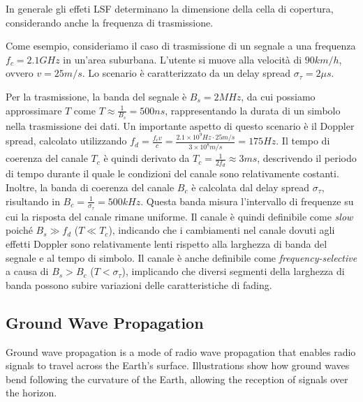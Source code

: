 In generale gli effeti LSF determinano la dimensione della cella di copertura, considerando anche la frequenza di trasmissione.


Come esempio, consideriamo il caso di trasmissione di un segnale a una frequenza \( f_c = 2.1 \si{GHz} \) in un'area suburbana. L'utente si muove alla velocità di $90 \si{km/h}$, ovvero \( v = 25 \si{m/s} \). Lo scenario è caratterizzato da un delay spread \( \sigma_\tau = 2 \si{\mu s} \).

Per la trasmissione, la banda del segnale è \( B_s = 2 \si{MHz} \), da cui possiamo approssimare \( T \) come \( T \approx \frac{1}{B_s} = 500 \si{ns} \), rappresentando la durata di un simbolo nella trasmissione dei dati.
Un importante aspetto di questo scenario è il Doppler spread, calcolato utilizzando \( f_d = \frac{f_c v}{c} = \frac{2.1 \times 10 ^9 \si{Hz} \cdot 25 \si{m/s}}{3 \times 10^8 \si{m/s}} = 175\si{Hz}\).
Il tempo di coerenza del canale \( T_c \) è quindi derivato da \( T_c = \frac{1}{2f_d} \approx 3 \si{ms}\), descrivendo il periodo di tempo durante il quale le condizioni del canale sono relativamente costanti.
Inoltre, la banda di coerenza del canale \( B_c \) è calcolata dal delay spread \( \sigma_\tau \), risultando in \( B_c = \frac{1}{\sigma_\tau} = 500 \si{kHz} \). Questa banda misura l'intervallo di frequenze su cui la risposta del canale rimane uniforme.
Il canale è quindi definibile come \textit{slow} poiché \( B_s \gg f_d \) (\( T \ll T_c \)), indicando che i cambiamenti nel canale dovuti agli effetti Doppler sono relativamente lenti rispetto alla larghezza di banda del segnale e al tempo di simbolo.
Il canale è anche definibile come \textit{frequency-selective} a causa di \( B_s > B_c \) (\( T < \sigma_\tau \)), implicando che diversi segmenti della larghezza di banda possono subire variazioni delle caratteristiche di fading. 


















\subsection*{Ground Wave Propagation}
Ground wave propagation is a mode of radio wave propagation that enables radio signals to travel across the Earth's surface. Illustrations show how ground waves bend following the curvature of the Earth, allowing the reception of signals over the horizon.

